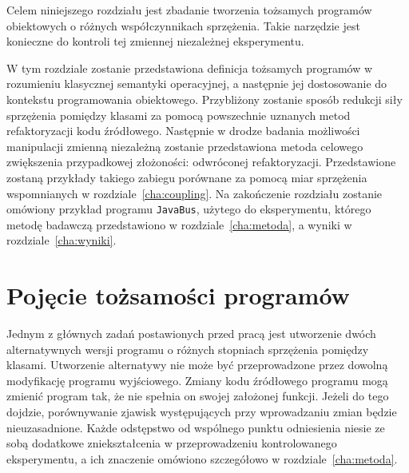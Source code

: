 Celem niniejszego rozdziału jest zbadanie tworzenia tożsamych programów obiektowych o różnych współczynnikach sprzężenia.
Takie narzędzie jest konieczne do kontroli tej zmiennej niezależnej eksperymentu.

W tym rozdziale zostanie przedstawiona definicja tożsamych programów w rozumieniu klasycznej semantyki operacyjnej,
a następnie jej dostosowanie do kontekstu programowania obiektowego.
Przybliżony zostanie sposób redukcji siły sprzężenia pomiędzy klasami za pomocą powszechnie uznanych metod
refaktoryzacji kodu źródłowego.
Następnie w drodze badania możliwości manipulacji zmienną niezależną zostanie przedstawiona metoda celowego zwiększenia
przypadkowej złożoności: odwróconej refaktoryzacji.
Przedstawione zostaną przykłady takiego zabiegu porównane za pomocą miar sprzężenia wspomnianych w rozdziale~\ref{cha:coupling}.
Na zakończenie rozdziału zostanie omówiony przykład programu \texttt{JavaBus}, użytego do eksperymentu, którego
metodę badawczą przedstawiono w rozdziale~\ref{cha:metoda}, a wyniki w rozdziale~\ref{cha:wyniki}.

\section{Pojęcie tożsamości programów}
\label{sec:equivalence}

Jednym z głównych zadań postawionych przed pracą jest utworzenie dwóch alternatywnych wersji programu o różnych
stopniach sprzężenia pomiędzy klasami.
Utworzenie alternatywy nie może być przeprowadzone przez dowolną modyfikację programu wyjściowego.
Zmiany kodu źródłowego programu mogą zmienić program tak, że nie spełnia on swojej założonej funkcji.
Jeżeli do tego dojdzie, porównywanie zjawisk występujących przy wprowadzaniu zmian będzie nieuzasadnione.
Każde odstępstwo od wspólnego punktu odniesienia niesie ze sobą dodatkowe zniekształcenia w przeprowadzeniu
kontrolowanego eksperymentu, a ich znaczenie omówiono szczegółowo w rozdziale~\ref{cha:metoda}.

